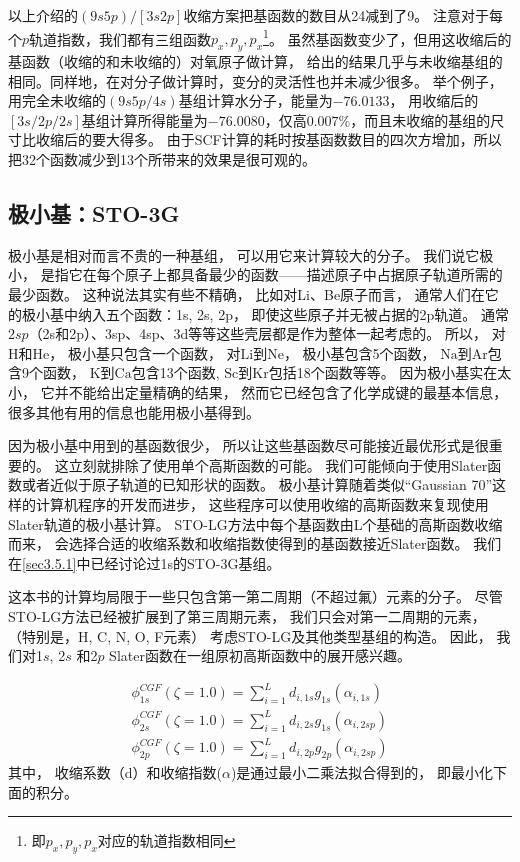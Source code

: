 以上介绍的$(9s5p)/[3s2p]$收缩方案把基函数的数目从24减到了9。
注意对于每个$p$轨道指数，我们都有三组函数$p_x,p_y,p_x$\footnote{
	即$p_x,p_y,p_x$对应的轨道指数相同
}。
虽然基函数变少了，但用这收缩后的基函数（收缩的和未收缩的）对氧原子做计算，
给出的结果几乎与未收缩基组的相同。同样地，在对分子做计算时，变分的灵活性也并未减少很多。
举个例子，用完全未收缩的$(9s5p/4s)$基组计算水分子，能量为$-76.0133$，
用收缩后的$[3s/2p/2s]$基组计算所得能量为$-76.0080$，仅高$0.007\%$，而且未收缩的基组的尺寸比收缩后的要大得多。
由于SCF计算的耗时按基函数数目的四次方增加，所以把32个函数减少到13个所带来的效果是很可观的。

\subsection{极小基：STO-3G}
极小基是相对而言不贵的一种基组，
可以用它来计算较大的分子。
我们说它极小，
是指它在每个原子上都具备最少的函数——描述原子中占据原子轨道所需的最少函数。
这种说法其实有些不精确，
比如对Li、Be原子而言，
通常人们在它的极小基中纳入五个函数：1s, 
2s, 
2p，
即使这些原子并无被占据的2p轨道。
通常$2sp$（2s和2p）、3sp、4sp、3d等等这些壳层都是作为整体一起考虑的。
所以，
对$\mathrm{H}$和$\mathrm{He}$，
极小基只包含一个函数，
对$\mathrm{Li}$到$\mathrm{Ne}$，
极小基包含5个函数，
$\mathrm{Na}$到$\mathrm{Ar}$包含9个函数，
$\mathrm{K}$到$\mathrm{Ca}$包含13个函数,
$\mathrm{Sc}$到$\mathrm{Kr}$包括18个函数等等。
因为极小基实在太小，
它并不能给出定量精确的结果，
然而它已经包含了化学成键的最基本信息，
很多其他有用的信息也能用极小基得到。


因为极小基中用到的基函数很少，
所以让这些基函数尽可能接近最优形式是很重要的。
这立刻就排除了使用单个高斯函数的可能。
我们可能倾向于使用Slater函数或者近似于原子轨道的已知形状的函数。
极小基计算随着类似“Gaussian 70”这样的计算机程序的开发而进步，
这些程序可以使用收缩的高斯函数来复现使用Slater轨道的极小基计算。
STO-LG方法中每个基函数由L个基础的高斯函数收缩而来，
会选择合适的收缩系数和收缩指数使得到的基函数接近Slater函数。
我们在\ref{sec3.5.1}中已经讨论过1s的STO-3G基组。


这本书的计算均局限于一些只包含第一第二周期（不超过氟）元素的分子。
尽管STO-LG方法已经被扩展到了第三周期元素，
我们只会对第一二周期的元素，
（特别是，H, C, N, O, F元素）
考虑STO-LG及其他类型基组的构造。
因此，
我们对1$s$,
2$s$ 和2$p$ Slater函数在一组原初高斯函数中的展开感兴趣。

\begin{align}
	\phi_{1s}^{CGF}(\zeta=1.0)=\sum_{i=1}^{L}d_{i,1s}g_{1s}(\alpha_{i,1s})\\
	\phi_{2s}^{CGF}(\zeta=1.0)=\sum_{i=1}^{L}d_{i,2s}g_{1s}(\alpha_{i,2sp})\\
	\phi_{2p}^{CGF}(\zeta=1.0)=\sum_{i=1}^{L}d_{i,2p}g_{2p}(\alpha_{i,2sp})
\end{align}
其中，
收缩系数（d）和收缩指数($\alpha$)是通过最小二乘法拟合得到的，
即最小化下面的积分。

